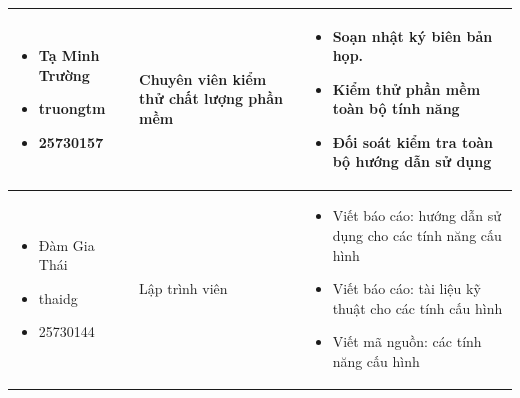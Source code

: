 \documentclass[12pt,a4paper]{article}
\begin{document}
\begin{table}[H]
\begin{tabularx}{\textwidth}{|m{3.5cm}|m{2.5cm}|>{\arraybackslash}X|}
\begin{itemize}[leftmargin=*, nosep, before=\vspace{1pt}, after=\vspace{1pt}]
    \item Tạ Minh Trường
    \item truongtm
    \item 25730157
\end{itemize} & Chuyên viên kiểm thử chất lượng phần mềm & 
\begin{itemize}[leftmargin=*, nosep, before=\vspace{1pt}, after=\vspace{1pt}]
    \item Soạn nhật ký biên bản họp.
    \item Kiểm thử phần mềm toàn bộ tính năng
    \item Đối soát kiểm tra toàn bộ hướng dẫn sử dụng
\end{itemize} \\ \hline

\begin{itemize}[leftmargin=*, nosep, before=\vspace{4pt}, after=\vspace{4pt}]
    \item Đàm Gia Thái
    \item thaidg
    \item 25730144
\end{itemize} & Lập trình viên & 
\begin{itemize}[leftmargin=*, nosep, before=\vspace{4pt}, after=\vspace{4pt}]
    \item Viết báo cáo: hướng dẫn sử dụng cho các tính năng cấu hình
    \item Viết báo cáo: tài liệu kỹ thuật cho các tính cấu hình
    \item Viết mã nguồn: các tính năng cấu hình
\end{itemize} \\ \hline


\end{tabularx}
\end{table}
\end{document}
